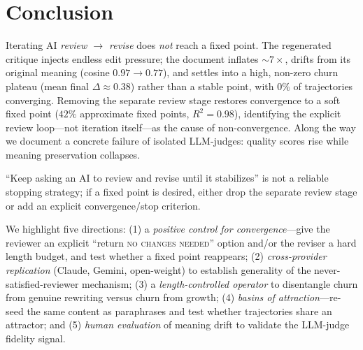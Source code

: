 \section{Conclusion}
\label{sec:conclusion}

Iterating AI \emph{review $\to$ revise} does \emph{not} reach a fixed point. The regenerated
critique injects endless edit pressure; the document inflates $\sim 7\times$, drifts from its
original meaning (cosine $0.97\to 0.77$), and settles into a high, non-zero churn plateau
(mean final $\Delta\approx 0.38$) rather than a stable point, with $0\%$ of trajectories
converging. Removing the separate review stage restores convergence to a soft fixed point
($42\%$ approximate fixed points, $R^2=0.98$), identifying the explicit review loop---not
iteration itself---as the cause of non-convergence. Along the way we document a concrete
failure of isolated LLM-judges: quality scores rise while meaning preservation collapses.

 ``Keep asking an AI to review and revise until it stabilizes'' is not a
reliable stopping strategy; if a fixed point is desired, either drop the separate review stage
or add an explicit convergence/stop criterion.

 We highlight five directions: (1) a \emph{positive control for
convergence}---give the reviewer an explicit ``return \textsc{no changes needed}'' option
and/or the reviser a hard length budget, and test whether a fixed point reappears;
(2) \emph{cross-provider replication} (Claude, Gemini, open-weight) to establish generality of
the never-satisfied-reviewer mechanism; (3) a \emph{length-controlled operator} to disentangle
churn from genuine rewriting versus churn from growth; (4) \emph{basins of attraction}---re-seed
the same content as paraphrases and test whether trajectories share an attractor; and
(5) \emph{human evaluation} of meaning drift to validate the LLM-judge fidelity signal.
